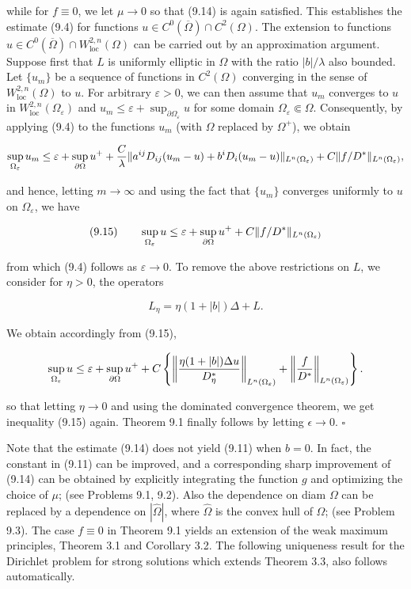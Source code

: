 while for $f\equiv 0$, we let $\mu\to 0$ so that (9.14) is again satisfied.
This establishes the estimate (9.4) for functions $u\in C^0(\overline{\Omega})\cap C^2(\Omega)$.
The extension to functions $u\in C^0(\overline{\Omega})\cap W^{2,n}_{\operatorname{loc}}(\Omega)$ can be carried out by an approximation argument.
Suppose first that $L$ is uniformly elliptic in $\Omega$ with the ratio $|b|/\lambda$ also bounded.
Let $\{u_m\}$ be a sequence of functions in $C^2(\Omega)$ converging in the sense of $W^{2,n}_{\operatorname{loc}}(\Omega)$ to $u$.
For arbitrary $\varepsilon>0$, we can then assume that $u_m$ converges to $u$ in $W^{2,n}_{\operatorname{loc}}(\Omega_\varepsilon)$ and $u_m\le \varepsilon+\sup_{\partial\Omega_\varepsilon}u$ for some domain $\Omega_\varepsilon\Subset\Omega$.
Consequently, by applying (9.4) to the functions $u_m$ (with $\Omega$ replaced by $\Omega^+$), we obtain

\[
\sup_{\Omega_\varepsilon} u_m
\le \varepsilon+\sup_{\partial\Omega}u^+
+\frac{C}{\lambda}\lVert a^{ij}D_{ij}(u_m-u)+b^iD_i(u_m-u)\rVert_{L^n(\Omega_\varepsilon)}
+C\lVert f/D^*\rVert_{L^n(\Omega_\varepsilon)},
\]

and hence, letting $m\to\infty$ and using the fact that $\{u_m\}$ converges uniformly to $u$ on $\Omega_\varepsilon$, we have

\[
(9.15)\qquad
\sup_{\Omega_\varepsilon}u
\le \varepsilon+\sup_{\partial\Omega}u^+
+C\lVert f/D^*\rVert_{L^n(\Omega_\varepsilon)}
\]

from which (9.4) follows as $\varepsilon\to 0$.
To remove the above restrictions on $L$, we consider for $\eta>0$, the operators

\[
L_\eta=\eta(1+|b|)\Delta+L.
\]

We obtain accordingly from (9.15),

\[
\sup_{\Omega_\varepsilon}u
\le \varepsilon+\sup_{\partial\Omega}u^+
+C\left\{
\left\|
\frac{\eta(1+|b|)\Delta u}{D^*_\eta}
\right\|_{L^n(\Omega_\varepsilon)}
+\left\|\frac{f}{D^*}\right\|_{L^n(\Omega_\varepsilon)}
\right\}.
\]



so that letting $\eta \to 0$ and using the dominated convergence theorem, we get
inequality (9.15) again. Theorem 9.1 finally follows by letting $\epsilon \to 0$. \hfill$\square$

\medskip

Note that the estimate (9.14) does not yield (9.11) when $b = 0$. In fact, the
constant in (9.11) can be improved, and a corresponding sharp improvement of (9.14)
can be obtained by explicitly integrating the function $g$ and optimizing the choice of
$\mu$; (see Problems 9.1, 9.2). Also the dependence on diam $\Omega$ can be replaced by a
dependence on $|\hat{\Omega}|$, where $\hat{\Omega}$ is the convex hull of $\Omega$; (see Problem 9.3).
The case $f \equiv 0$ in Theorem 9.1 yields an extension of the weak maximum
principles, Theorem 3.1 and Corollary 3.2. The following uniqueness result for the
Dirichlet problem for strong solutions which extends Theorem 3.3, also follows
automatically.

